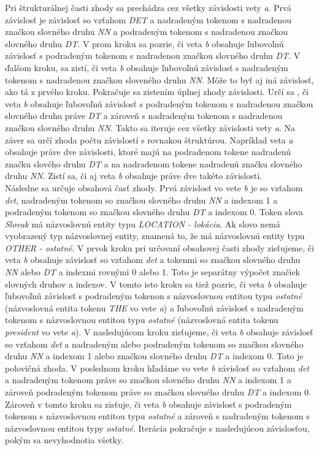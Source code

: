 Pri štrukturálnej časti zhody sa prechádza cez všetky závislosti vety \textit{a}. Prvá závislosť je závislosť so vzťahom \textit{DET} a nadradeným tokenom s nadradenou značkou slovného druhu \textit{NN} a podradeným tokenom s nadradenou značkou slovného druhu \textit{DT}. V prom kroku sa pozrie, či veta \textit{b} obsahuje ľubovoľnú závislosť s podradeným tokenom s nadradenou značkou slovného druhu \textit{DT}. V ďalšom kroku, sa zistí, či veta \textit{b} obsahuje ľubovoľnú závislosť s nadradeným tokenom s nadradenou značkou sloveného druhu \textit{NN}. Môže to byť aj iná závislosť, ako tá z prvého kroku. Pokračuje sa zistením úplnej zhody závislosti. Určí sa , či veta \textit{b} obsahuje ľubovoľnú závislosť s podradeným tokenom s nadradenou značkou slovného druhu práve \textit{DT} a zároveň s nadradeným tokenom s nadradenou značkou slovného druhu \textit{NN}. Takto sa iteruje cez všetky závislosti vety \textit{a}. Na záver sa určí zhoda počtu závislostí s rovnakou štruktúrou. Napríklad veta \textit{a} obsahuje práve dve závislosti, ktoré majú na podradenom tokene nadradenú značku slového druhu \textit{DT} a na nadradenom tokene nadradenú značku slovného druhu \textit{NN}. Zistí sa, či aj veta \textit{b} obsahuje práve dve takéto závislosti. \\

Následne sa určuje obsahová časť zhody. Prvá závislosť vo vete \textit{b} je so vzťahom \textit{det}, nadradeným tokenom so značkou slovného druhu \textit{NN} a indexom 1 a podradeným tokenom so značkou slovného druhu \textit{DT} a indexom 0. Token slova \textit{Slovak} má názvoslovnú entity typu \textit{LOCATION - lokácia}. Ak slovo nemá vyobrazený typ názvoslovnej entity, znamená to, že má názvoslovnú entity typu \textit{OTHER - ostatné}. V prvok kroku pri určovaní obsahovej časti zhody zisťujeme, či veta \textit{b} obsahuje závislosť so vzťahom \textit{det} a tokenmi so značkou slovného druhu \textit{NN} alebo \textit{DT} a indexmi rovnými 0 alebo 1. Toto je separátny výpočet značiek slovných druhov a indexov. V tomto isto kroku sa tiež pozrie, či veta \textit{b} obsahuje ľubovoľnú závislosť s podradeným tokenon s názvoslovnou entitou typu \textit{ostatné} (názvoslovná entita tokenu \textit{THE} vo vete \textit{a}) a ľubovoľnú závislosť s nadradeným tokenom s názvoslovnou entitou typu \textit{ostatné} (názvoslovná entita tokenu \textit{president} vo vete \textit{a}). V nasledujúcom kroku zisťujeme, či veta \textit{b} obsahuje závislosť so vzťahom \textit{det} a nadradeným alebo podradeným tokenom so značkou slovného druhu \textit{NN} a indexom 1 alebo značkou slovného druhu \textit{DT} a indexom 0. Toto je polovičná zhoda. V poslednom kroku hľadáme vo vete \textit{b} závislosť so vzťahom \textit{det} a nadradeným tokenom práve so značkou slovného druhu \textit{NN} a indexom 1 a zároveň podradeným tokenom práve so značkou slovného druhu \textit{DT} a indexom 0. Zároveň v tomto kroku sa zisťuje, či veta \textit{b} obsahuje závislosť s podradeným tokenom s názvoslovnou entitou typu \textit{ostatné} a zároveň s nadradeným tokenom s názvoslovnou entitou typy \textit{ostatné}. Iterácia pokračuje s nasledujúcou závislosťou, pokým sa nevyhodnotia všetky. \\

